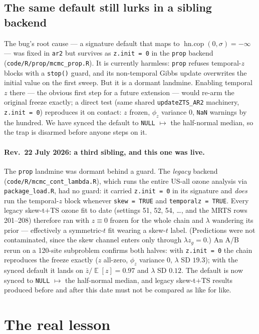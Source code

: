 \documentclass[11pt]{article}
\newcommand{\code}[1]{\texttt{#1}}
\DeclareMathOperator{\E}{\mathbb{E}}
\begin{document}
\subsection{The same default still lurks in a sibling backend}

The bug's root cause --- a signature default that maps to
$\operatorname{hn.cop}(0,\sigma) = -\infty$ --- was fixed in \code{ar2} but
survives as \code{z.init = 0} in the \code{prop} backend
(\code{code/R/prop/mcmc\_prop.R}). It is currently harmless: \code{prop}
refuses temporal-$z$ blocks with a \code{stop()} guard, and its non-temporal
Gibbs update overwrites the initial value on the first sweep. But it is a
dormant landmine. Enabling temporal $z$ there --- the obvious first step for a
future extension --- would re-arm the original freeze exactly; a direct test
(same shared \code{updateZTS\_AR2} machinery, \code{z.init = 0}) reproduces it
on contact: $z$ frozen, $\phi_z$ variance $0$, \code{NaN} warnings by the
hundred. We have synced the default to \code{NULL} $\mapsto$ the half-normal
median, so the trap is disarmed before anyone steps on it.

\paragraph{Rev.\ 22 July 2026: a third sibling, and this one was live.} The
\code{prop} landmine was dormant behind a guard. The \emph{legacy} backend
(\code{code/R/mcmc\_cont\_lambda.R}), which runs the entire US-all ozone
analysis via \code{package\_load.R}, had no guard: it carried
\code{z.init = 0} in its signature and \emph{does} run the temporal-$z$ block
whenever \code{skew = TRUE} and \code{temporalz = TRUE}. Every legacy
skew-t$+$TS ozone fit to date (settings 51, 52, 54, \ldots, and the MRTS rows
201--208) therefore ran with $z \equiv 0$ frozen for the whole chain and
$\lambda$ wandering its prior --- effectively a symmetric-$t$ fit wearing a
skew-$t$ label. (Predictions were not contaminated, since the skew channel
enters only through $\lambda z_{g} = 0$.) An A/B rerun on a 120-site
subproblem confirms both halves: with \code{z.init = 0} the chain reproduces
the freeze exactly ($z$ all-zero, $\phi_z$ variance $0$, $\lambda$ SD
$19.3$); with the synced default it lands on $\bar z / \E[z] = 0.97$ and
$\lambda$ SD $0.12$. The default is now synced to \code{NULL} $\mapsto$ the
half-normal median, and legacy skew-t$+$TS results produced before and after
this date must not be compared as like for like.

\section{The real lesson}
\end{document}

